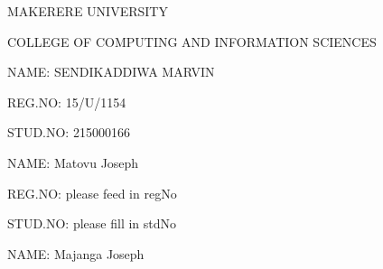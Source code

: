 \documentclass[14pt]{article}
\begin{document}
		

		\begin{center} \begin{Huge}  MAKERERE UNIVERSITY \end{Huge} \end{center} 

		 \begin{center}\begin{Huge}  COLLEGE OF COMPUTING AND INFORMATION SCIENCES    \end{Huge} \end{center}
	




		\begin{flushleft} \begin{huge} NAME: SENDIKADDIWA MARVIN   \end{huge} \end{flushleft}

		\begin{flushleft} \begin{huge} REG.NO: 15/U/1154   \end{huge} \end{flushleft}

		\begin{flushleft} \begin{huge} STUD.NO: 215000166    \end{huge} \end{flushleft}
		
		
				\begin{flushleft} \begin{huge} NAME: Matovu Joseph   \end{huge} \end{flushleft}

		\begin{flushleft} \begin{huge} REG.NO: please feed in regNo   \end{huge} \end{flushleft}

		\begin{flushleft} \begin{huge} STUD.NO: please fill in stdNo    \end{huge} \end{flushleft}
		
		

		\begin{flushleft} \begin{huge} NAME: Majanga Joseph   \end{huge} \end{flushleft}
\end{document}
